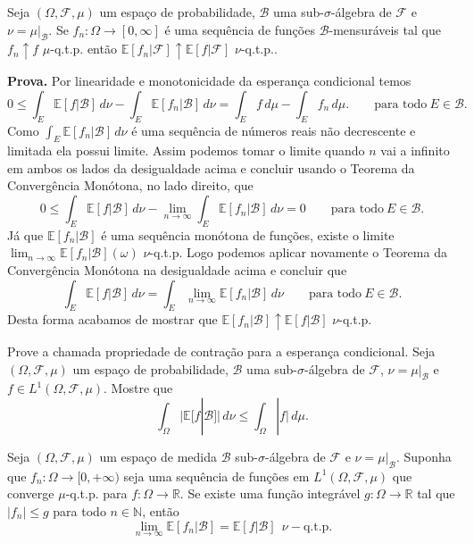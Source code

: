 \begin{teorema}
	\label{teo:convergencia-monotona-esp-cond}
	Seja $(\Omega,\mathcal{F},\mu)$ um espaço de probabilidade, $\mathcal{B}$ uma sub-$\sigma$-álgebra de $\mathcal{F}$ e $\nu=\mu|_{\mathcal{B}}$. 
	Se $f_n:\Omega\to[0,\infty]$ é uma sequência de funções
	$\mathcal{B}$-mensuráveis tal que $f_n\uparrow f$ $\mu$-q.t.p. então $\mathbb{E}[f_n|\mathcal{F}]\uparrow \mathbb{E}[f|\mathcal{F}]$ $\nu$-q.t.p..
\end{teorema}
\textbf{Prova.}
Por linearidade e monotonicidade da esperança condicional temos 
$$
0\leq \int_{E} \mathbb{E}[f|\mathcal{B}]\, d\nu - \int_{E} \mathbb{E}[f_n|\mathcal{B}]\, d\nu
=\int_{E} f\, d\mu - \int_{E} f_n\, d\mu.
\qquad \text{para todo}\ E\in\mathcal{B}.
$$
Como $\int_{E} \mathbb{E}[f_n|\mathcal{B}]\, d\nu$ é uma sequência de números reais não decrescente e limitada ela possui limite. 
Assim podemos tomar o limite quando $n$ vai a infinito em ambos os lados da desigualdade acima e concluir usando o Teorema da Convergência Monótona, 
no lado direito,  que
$$
0\leq \int_{E} \mathbb{E}[f|\mathcal{B}]\, d\nu - \lim_{n\to\infty}\int_{E} \mathbb{E}[f_n|\mathcal{B}]\, d\nu
=0
\qquad \text{para todo}\ E\in\mathcal{B}.
$$
Já que $\mathbb{E}[f_n|\mathcal{B}]$ é uma sequência monótona de funções, existe o limite $\lim_{n\to\infty}\mathbb{E}[f_n|\mathcal{B}](\omega)$ $\nu$-q.t.p.
Logo podemos aplicar novamente o Teorema da Convergência Monótona
na desigualdade acima e concluir que 
$$
\int_{E} \mathbb{E}[f|\mathcal{B}]\, d\nu = \int_{E} \lim_{n\to\infty}\mathbb{E}[f_n|\mathcal{B}]\, d\nu
\qquad \text{para todo}\ E\in\mathcal{B}.
$$
Desta forma acabamos de mostrar que $\mathbb{E}[f_n|\mathcal{B}]\uparrow \mathbb{E}[f|\mathcal{B}]$ $\nu$-q.t.p.
\bigskip
\begin{exercicio} Prove a chamada propriedade de contração para a esperança condicional. 
	Seja $(\Omega,\mathcal{F},\mu)$ um espaço de probabilidade, $\mathcal{B}$ uma sub-$\sigma$-álgebra de $\mathcal{F}$, $\nu=\mu|_{\mathcal{B}}$ e 
	$f\in L^1(\Omega,\mathcal{F},\mu)$. Mostre que
	$$
	\int_{\Omega} \big|\mathbb{E}[f|\mathcal{B}]\big|\, d\nu \leq \int_{\Omega} |f|\, d\mu.
	$$
\end{exercicio}
\begin{teorema} 
	Seja $(\Omega,\mathcal{F},\mu)$ um espaço de medida $\mathcal{B}$ sub-$\sigma$-álgebra de $\mathcal{F}$ e $\nu=\mu|_{\mathcal{B}}$. 
	Suponha que $f_n:\Omega\to [0,+\infty)$ seja uma sequência de funções 
	em $L^1(\Omega,\mathcal{F},\mu)$ que converge $\mu$-q.t.p. para $f:\Omega\to\mathbb{R}$.
	Se existe uma função integrável $g:\Omega\to\mathbb{R}$ tal que $|f_n|\leq g$ para todo $n\in\mathbb{N}$, então 
	$$
	\lim_{n\to\infty} \mathbb{E}[f_n|\mathcal{B}]=\mathbb{E}[f|\mathcal{B}] \ \ 
	\nu-\text{q.t.p.}
	$$
\end{teorema}
